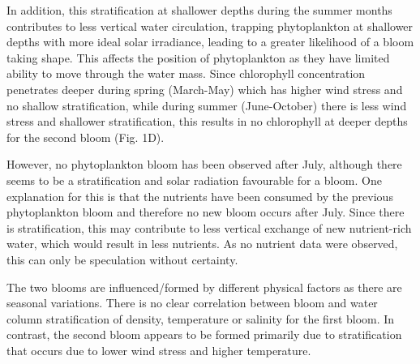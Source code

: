 \documentclass[../Main.tex]{subfiles}
\begin{document}
In addition, this stratification at shallower depths during the summer months contributes to less vertical water circulation, trapping phytoplankton at shallower depths with more ideal solar irradiance, leading to a greater likelihood of a bloom taking shape. This affects the position of phytoplankton as they have limited ability to move through the water mass\supercite{kase2018phytoplankton}.
Since chlorophyll concentration penetrates deeper during spring (March-May) which has higher wind stress and no shallow stratification, while during summer (June-October) there is less wind stress and shallower stratification, this results in no chlorophyll at deeper depths for the second bloom (Fig. 1D).

However, no phytoplankton bloom has been observed after July, although there seems to be a stratification and solar radiation favourable for a bloom. One explanation for this is that the nutrients have been consumed by the previous phytoplankton bloom and therefore no new bloom occurs after July. Since there is stratification, this may contribute to less vertical exchange of new nutrient-rich water, which would result in less nutrients. As no nutrient data were observed, this can only be speculation without certainty. 

The two blooms are influenced/formed by different physical factors as there are seasonal variations. There is no clear correlation between bloom and water column stratification of density, temperature or salinity for the first bloom. In contrast, the second bloom appears to be formed primarily due to stratification that occurs due to lower wind stress and higher temperature.








 
\end{document}
